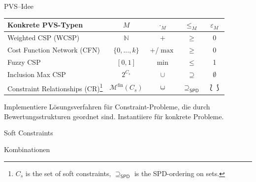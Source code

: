 \begin{frame}[fragile]{PVS--Idee}
\begin{center}
\begin{tabular}{l|c|c|c|c}
\textbf{Konkrete PVS-Typen} & $M$ & $\cdot_M$ & $\leq_M$ & $\varepsilon_M$ \\ 
\hline 
Weighted CSP (WCSP)& $\mathbb{N}$ & $+$ & $\geq$ & $0$ \\ 
Cost Function Network (CFN)& $\{0,\ldots,k\}$ & $+$/$\max$ & $\geq$ & $0$ \\ 
Fuzzy CSP & $[0,1]$ & $\min$ & $\leq$  & 1 \\ 
Inclusion Max CSP & $2^{C_s}$ & $\cup$ & $\supseteq$  & $\emptyset$ \\ 
Constraint Relationships (CR)\footnote{$C_s$ is the set of soft constraints, $\supseteq_{\mathsf{SPD}}$ is the SPD-ordering on sets.} &$\mathcal{M}^{\mathrm{fin}} (C_s)$ & $\mcup$ & $\supseteq_{\mathsf{SPD}}$ & $\lbag \rbag$ \\ 
\end{tabular} 
\end{center}

\begin{parchment}[Hauptidee]
Implementiere Lösungsverfahren für Constraint-Probleme, die durch Bewertungsstrukturen geordnet sind. Instantiiere für konkrete Probleme.
\end{parchment}
\end{frame}

\begin{frame}{Soft Constraints} \large
\begin{figure}
\centering

\end{figure}
\vspace*{-2.4ex}
\end{frame}

\begin{frame}{Kombinationen~\cite{SchiendorferPvs2015}}
\fontsize{8pt}{7.2}\selectfont

%
%
%
\end{frame}
